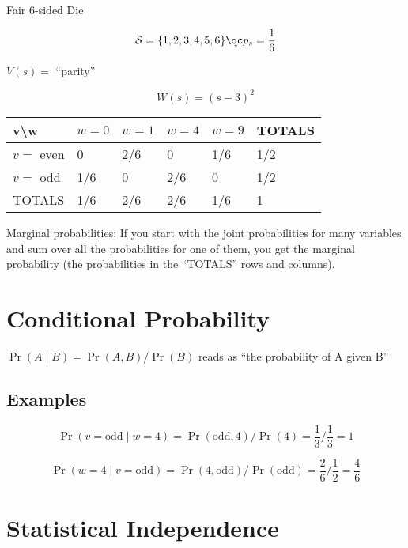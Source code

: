 \documentclass[a4paper,twoside,master.tex]{subfiles}
\begin{document}
\begin{ex}
    Fair 6-sided Die

\begin{equation}
\mathcal{S} = \{1,2,3,4,5,6\} \qc p_s=\frac{1}{6}
\end{equation}

$V(s)=$ ``parity''

\begin{equation}
W(s) = (s-3)^2
\end{equation}

\begin{longtable}[]{@{}llllll@{}}
\toprule
v\textbackslash w & $w=0$ & $w=1$ & $w=4$ & $w=9$ &
TOTALS\tabularnewline
\midrule
\endhead
$v=$ even & 0 & 2/6 & 0 & 1/6 & 1/2\tabularnewline
$v=$ odd & 1/6 & 0 & 2/6 & 0 & 1/2\tabularnewline
TOTALS & 1/6 & 2/6 & 2/6 & 1/6 & 1\tabularnewline
\bottomrule
\end{longtable}

Marginal probabilities: If you start with the joint probabilities for
many variables and sum over all the probabilities for one of them, you
get the marginal probability (the probabilities in the ``TOTALS'' rows and
columns).
\end{ex}

\section{Conditional Probability}
\label{sec:conditional_probability}

$\Pr(A\mid B) = \Pr(A,B)/\Pr(B)$ reads as ``the probability of A given
B''

\subsection{Examples}
\label{sub:examples}

\begin{equation}
\Pr(v=\text{odd}\mid w=4)=\Pr(\text{odd},4)/\Pr(4) = \frac{1}{3}/\frac{1}{3} = 1
\end{equation}

\begin{equation}
\Pr(w=4\mid v=\text{odd})=\Pr(4,\text{odd})/\Pr(\text{odd}) = \frac{2}{6}/\frac{1}{2} = \frac{4}{6}
\end{equation}

\section{Statistical Independence}
\label{sec:statistical_independence}
\end{document}

